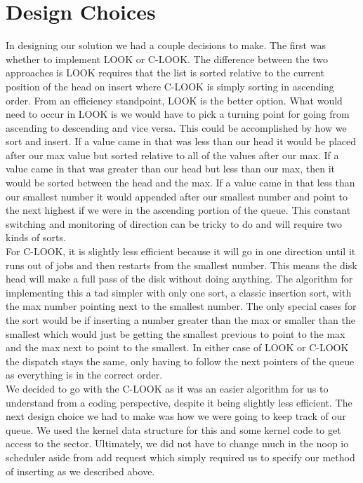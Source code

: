 \documentclass[letterpaper,10pt,serif,draftclsnofoot,onecolumn,compsoc,titlepage]{IEEEtran}
\begin{document}
\section{Design Choices}
In designing our solution we had a couple decisions to make. The first was
whether to implement LOOK or C-LOOK. The difference between the two
approaches is LOOK requires that the list is sorted relative to the current
position of the head on insert where C-LOOK is simply sorting in ascending
order. From an efficiency standpoint, LOOK is the better option. What
would need to occur in LOOK is we would have to pick a turning point for
going from ascending to descending and vice versa. This could be
accomplished by how we sort and insert. If a value came in that was less
than our head it would be placed after our max value but sorted relative to
all of the values after our max. If a value came in that was greater than
our head but less than our max, then it would be sorted between the head
and the max. If a value came in that less than our smallest number it would
appended after our smallest number and point to the next highest if
we were in the ascending portion of the queue. This constant switching
and monitoring of direction can be tricky to do and will require two kinds
of sorts. \\
For C-LOOK, it is slightly less efficient because it will go in one
direction until it runs out of jobs and then restarts from the smallest
number. This means the disk head will make a full pass of the disk without
doing anything. The algorithm for implementing this a tad simpler with only
one sort, a classic insertion sort, with the max number pointing next to
the smallest number. The only special cases for the sort would be if
inserting a number greater than the max or smaller than the smallest which
would just be getting the smallest previous to point to the max and the
max next to point to the smallest. In either case of LOOK or C-LOOK the
dispatch stays the same, only having to follow the next pointers of the
queue as everything is in the correct order. \\
We decided to go with the C-LOOK as it was an easier algorithm for us to
understand from a coding perspective, despite it being slightly less
efficient. The next design choice we had to make was how we were going
to keep track of our queue. We used the kernel data structure for this and
some kernel code to get access to the sector. Ultimately, we did not have
to change much in the noop io scheduler aside from add request which simply
required us to specify our method of inserting as we described above.
\end{document}
